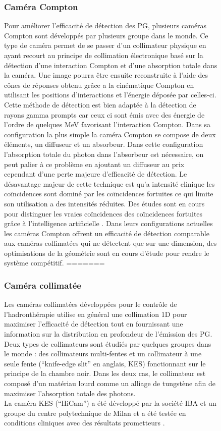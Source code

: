 \documentclass[11pt,a4paper,oldfontcommands]{memoir}
\begin{document}
\begin{figure}
\subsubsection{Caméra Compton}
Pour améliorer l’efficacité de détection des PG, plusieurs caméras Compton sont développés par plusieurs groupe dans le monde. Ce type de caméra permet de se passer d'un collimateur physique en ayant recourt au principe de collimation électronique basé sur la détection d'une interaction Compton et d'une absorption totale dans la caméra. Une image pourra être ensuite reconstruite à l'aide des cônes de réponses obtenu grâce a la cinématique Compton en utilisant les positions d’interactions et l'énergie déposée par celles-ci. Cette méthode de détection est bien adaptée à la détection de rayons gamma prompts car ceux ci sont émis avec des énergie de l'ordre de quelques MeV favorisant l'interaction Compton. Dans sa configuration la plus simple la caméra Compton se compose de deux éléments, un diffuseur et un absorbeur. Dans cette configuration l'absorption totale du photon dans l'absorbeur est nécessaire, on peut palier à ce problème en ajoutant un diffuseur au prix cependant d'une perte majeure d'efficacité de détection. Le désavantage majeur de cette technique est qu'a intensité clinique les coïncidences sont dominé par les coïncidences fortuites ce qui limite son utilisation a des intensités réduites. Des études sont en cours pour distinguer les vraies coïncidences des coïncidences fortuites grâce à l'intelligence artificielle \cite{Fontana_2020}. Dans leurs configurations actuelles les caméras Compton offrent un efficacité de détection comparable aux caméras collimatées qui ne détectent que sur une dimension, des optimisations de la géométrie sont en cours d'étude pour rendre le système compétitif. 
=======

\subsubsection{Caméra collimatée}

Les caméras collimatées développées pour le contrôle de l'hadronthérapie utilise en général une collimation 1D pour maximiser l'efficacité de détection tout en fournissant une information sur la distribution en profondeur de l'émission des PG. Deux types de collimateurs sont étudiés par quelques groupes dans le monde : des collimateurs multi-fentes \cite{Pinto_2014,MinSimu} et un collimateur à une seule fente (\enquote{knife-edge slit} en anglais, KES) \cite{Smeets_2012} fonctionnant sur le principe de la chambre noir. Dans les deux cas, le collimateur est composé d'un matériau lourd comme un alliage de tungstène afin de maximiser l'absorption totale des photons. \\
La caméra KES (\enquote{HiCam}) a été développé par la société IBA et un groupe du centre polytechnique de Milan et a été testée en conditions cliniques avec des résultats prometteurs \cite{Richter2016}. 


\end{figure}
\end{document}

